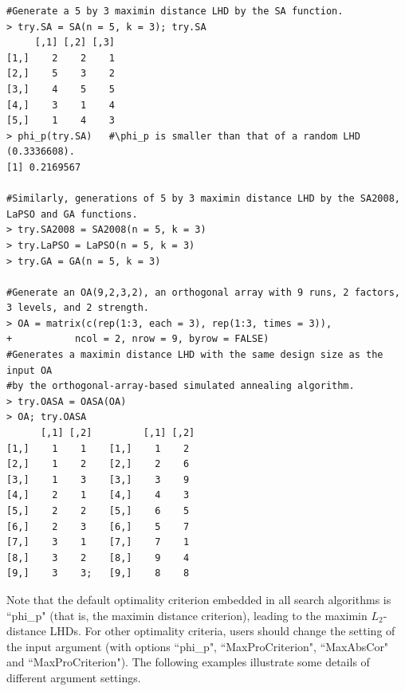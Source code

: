 {\small
	\begin{verbatim}
#Generate a 5 by 3 maximin distance LHD by the SA function.
> try.SA = SA(n = 5, k = 3); try.SA
     [,1] [,2] [,3]
[1,]    2    2    1
[2,]    5    3    2
[3,]    4    5    5
[4,]    3    1    4
[5,]    1    4    3
> phi_p(try.SA)   #\phi_p is smaller than that of a random LHD (0.3336608).
[1] 0.2169567

#Similarly, generations of 5 by 3 maximin distance LHD by the SA2008, LaPSO and GA functions.
> try.SA2008 = SA2008(n = 5, k = 3)
> try.LaPSO = LaPSO(n = 5, k = 3)
> try.GA = GA(n = 5, k = 3)

#Generate an OA(9,2,3,2), an orthogonal array with 9 runs, 2 factors, 3 levels, and 2 strength.
> OA = matrix(c(rep(1:3, each = 3), rep(1:3, times = 3)),
+           ncol = 2, nrow = 9, byrow = FALSE)
#Generates a maximin distance LHD with the same design size as the input OA
#by the orthogonal-array-based simulated annealing algorithm.
> try.OASA = OASA(OA)
> OA; try.OASA
      [,1] [,2]         [,1] [,2]
[1,]    1    1    [1,]    1    2
[2,]    1    2    [2,]    2    6
[3,]    1    3    [3,]    3    9
[4,]    2    1    [4,]    4    3
[5,]    2    2    [5,]    6    5
[6,]    2    3    [6,]    5    7
[7,]    3    1    [7,]    7    1
[8,]    3    2    [8,]    9    4
[9,]    3    3;   [9,]    8    8
	\end{verbatim}
}

Note that the default optimality criterion embedded in all search algorithms is ``phi\_p" (that is, the maximin distance criterion), leading to the maximin $L_2$-distance LHDs. For other optimality criteria, users should change the setting of the input argument  (with options ``phi\_p", ``MaxProCriterion", ``MaxAbsCor" and ``MaxProCriterion"). The following examples illustrate some details of different argument settings.

